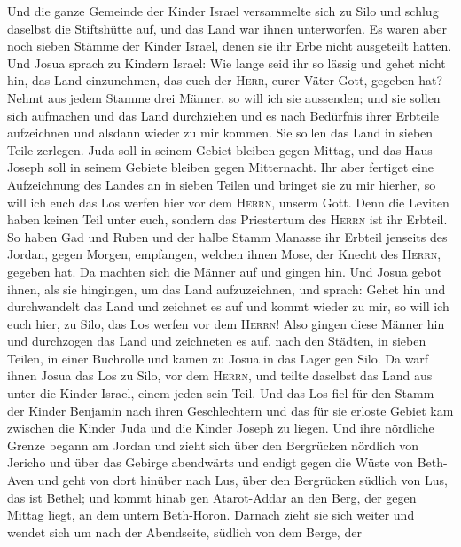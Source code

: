  Und die ganze Gemeinde der Kinder Israel versammelte sich
zu Silo und schlug daselbst die Stiftshütte auf, und das Land war ihnen
unterworfen.  Es waren aber noch sieben Stämme der Kinder
Israel, denen sie ihr Erbe nicht ausgeteilt hatten.  Und
Josua sprach zu Kindern Israel: Wie lange seid ihr so lässig und gehet
nicht hin, das Land einzunehmen, das euch der \textsc{Herr}, eurer Väter
Gott, gegeben hat?  Nehmt aus jedem Stamme drei Männer, so
will ich sie aussenden; und sie sollen sich aufmachen und das Land
durchziehen und es nach Bedürfnis ihrer Erbteile aufzeichnen und alsdann
wieder zu mir kommen.  Sie sollen das Land in sieben Teile
zerlegen. Juda soll in seinem Gebiet bleiben gegen Mittag, und das Haus
Joseph soll in seinem Gebiete bleiben gegen Mitternacht. 
Ihr aber fertiget eine Aufzeichnung des Landes an in sieben Teilen und
bringet sie zu mir hierher, so will ich euch das Los werfen hier vor dem
\textsc{Herrn}, unserm Gott.  Denn die Leviten haben
keinen Teil unter euch, sondern das Priestertum des \textsc{Herrn} ist
ihr Erbteil. So haben Gad und Ruben und der halbe Stamm Manasse ihr
Erbteil jenseits des Jordan, gegen Morgen, empfangen, welchen ihnen
Mose, der Knecht des \textsc{Herrn}, gegeben hat.  Da
machten sich die Männer auf und gingen hin. Und Josua gebot ihnen, als
sie hingingen, um das Land aufzuzeichnen, und sprach: Gehet hin und
durchwandelt das Land und zeichnet es auf und kommt wieder zu mir, so
will ich euch hier, zu Silo, das Los werfen vor dem \textsc{Herrn}!
 Also gingen diese Männer hin und durchzogen das Land und
zeichneten es auf, nach den Städten, in sieben Teilen, in einer
Buchrolle und kamen zu Josua in das Lager gen Silo.  Da
warf ihnen Josua das Los zu Silo, vor dem \textsc{Herrn}, und teilte
daselbst das Land aus unter die Kinder Israel, einem jeden sein Teil.
 Und das Los fiel für den Stamm der Kinder Benjamin nach
ihren Geschlechtern und das für sie erloste Gebiet kam zwischen die
Kinder Juda und die Kinder Joseph zu liegen.  Und ihre
nördliche Grenze begann am Jordan und zieht sich über den Bergrücken
nördlich von Jericho und über das Gebirge abendwärts und endigt gegen
die Wüste von Beth-Aven  und geht von dort hinüber nach
Lus, über den Bergrücken südlich von Lus, das ist Bethel; und kommt
hinab gen Atarot-Addar an den Berg, der gegen Mittag liegt, an dem
untern Beth-Horon.  Darnach zieht sie sich weiter und
wendet sich um nach der Abendseite, südlich von dem Berge, der
